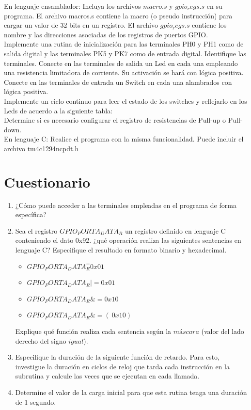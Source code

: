 \documentclass[a4paper,11pt]{article}                 %
\begin{document}
En lenguaje ensamblador: Incluya los archivos $macro.s$ y $gpio_regs.s$ en su programa. El archivo macros.s contiene la macro (o pseudo instrucción) para cargar un valor de 32 bits en un registro. El archivo $gpio_regs.s$ contiene los nombre y las direcciones asociadas de los registros de puertos GPIO. \\
 Implemente una rutina de inicialización para las terminales PH0 y PH1 como de salida digital y las terminales PK5 y PK7 como de entrada digital. Identifique las terminales. Conecte en las terminales de salida un Led en cada una empleando una resistencia limitadora de corriente. Su activación se hará con lógica positiva. Conecte en las terminales de entrada un Switch en cada una alambrados con lógica positiva. 
\\
Implemente un ciclo continuo para leer  el estado de los switches y reflejarlo en los Leds de acuerdo a la siguiente tabla: 
\\
Determine si es necesario configurar el registro de resistencias de Pull-up o Pull-down.
\\
 En lenguaje C:  Realice el programa con la misma funcionalidad. Puede incluir el archivo tm4c1294ncpdt.h 
  
  \section{Cuestionario}
  
  \begin{enumerate}
  	 
  	
  	\item ¿Cómo puede acceder a las terminales empleadas en el programa de forma específica? 

  	\item Sea el registro $GPIO_PORTA_DATA_R$ un registro definido en lenguaje C conteniendo el dato 0x92. ¿qué operación realiza las siguientes sentencias en lenguaje C? Especifique el resultado en formato binario y hexadecimal.  
  	
  	\begin{itemize}
  \item $GPIO_PORTA_DATA_R ^= 0x01$
  \item $GPIO_PORTA_DATA_R |= 0x01 $
  \item $GPIO_PORTA_DATA_R \&= 0x10$
  \item $GPIO_PORTA_DATA_R \&= (~0x10) $	
    \end{itemize}
Explique qué función realiza cada sentencia según la $máscara$ (valor del lado derecho del signo $igual$). 

  	\item Especifique la duración de la siguiente función de retardo. Para esto, investigue la duración en ciclos de reloj que tarda cada instrucción en la subrutina y calcule las veces que se ejecutan en cada llamada.
  	
  	\item Determine el valor de la carga inicial para que esta rutina tenga una duración de 1 segundo. 
  	  
  \end{enumerate}
\end{document}
